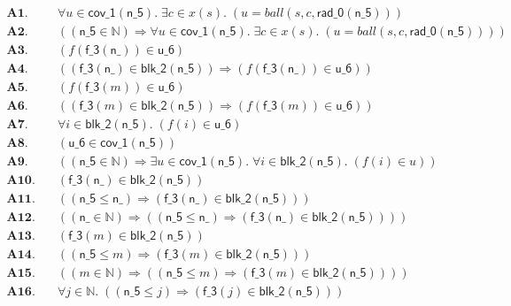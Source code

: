 \documentclass[11pt]{article}
\begin{document}
\begin{align*}
  \mathbf{A1.}\quad & \forall u \in \mathsf{cov\_1}(\mathsf{n\_5}).\; \exists c \in x(s).\; (u = \mathit{ball}(s, c, \mathsf{rad\_0}(\mathsf{n\_5}))) \\
  \mathbf{A2.}\quad & ((\mathsf{n\_5} \in \mathbb{N}) \Rightarrow \forall u \in \mathsf{cov\_1}(\mathsf{n\_5}).\; \exists c \in x(s).\; (u = \mathit{ball}(s, c, \mathsf{rad\_0}(\mathsf{n\_5})))) \\
  \mathbf{A3.}\quad & (f(\mathsf{f\_3}(\mathsf{n\_})) \in \mathsf{u\_6}) \\
  \mathbf{A4.}\quad & ((\mathsf{f\_3}(\mathsf{n\_}) \in \mathsf{blk\_2}(\mathsf{n\_5})) \Rightarrow (f(\mathsf{f\_3}(\mathsf{n\_})) \in \mathsf{u\_6})) \\
  \mathbf{A5.}\quad & (f(\mathsf{f\_3}(m)) \in \mathsf{u\_6}) \\
  \mathbf{A6.}\quad & ((\mathsf{f\_3}(m) \in \mathsf{blk\_2}(\mathsf{n\_5})) \Rightarrow (f(\mathsf{f\_3}(m)) \in \mathsf{u\_6})) \\
  \mathbf{A7.}\quad & \forall i \in \mathsf{blk\_2}(\mathsf{n\_5}).\; (f(i) \in \mathsf{u\_6}) \\
  \mathbf{A8.}\quad & (\mathsf{u\_6} \in \mathsf{cov\_1}(\mathsf{n\_5})) \\
  \mathbf{A9.}\quad & ((\mathsf{n\_5} \in \mathbb{N}) \Rightarrow \exists u \in \mathsf{cov\_1}(\mathsf{n\_5}).\; \forall i \in \mathsf{blk\_2}(\mathsf{n\_5}).\; (f(i) \in u)) \\
  \mathbf{A10.}\quad & (\mathsf{f\_3}(\mathsf{n\_}) \in \mathsf{blk\_2}(\mathsf{n\_5})) \\
  \mathbf{A11.}\quad & ((\mathsf{n\_5} \leq \mathsf{n\_}) \Rightarrow (\mathsf{f\_3}(\mathsf{n\_}) \in \mathsf{blk\_2}(\mathsf{n\_5}))) \\
  \mathbf{A12.}\quad & ((\mathsf{n\_} \in \mathbb{N}) \Rightarrow ((\mathsf{n\_5} \leq \mathsf{n\_}) \Rightarrow (\mathsf{f\_3}(\mathsf{n\_}) \in \mathsf{blk\_2}(\mathsf{n\_5})))) \\
  \mathbf{A13.}\quad & (\mathsf{f\_3}(m) \in \mathsf{blk\_2}(\mathsf{n\_5})) \\
  \mathbf{A14.}\quad & ((\mathsf{n\_5} \leq m) \Rightarrow (\mathsf{f\_3}(m) \in \mathsf{blk\_2}(\mathsf{n\_5}))) \\
  \mathbf{A15.}\quad & ((m \in \mathbb{N}) \Rightarrow ((\mathsf{n\_5} \leq m) \Rightarrow (\mathsf{f\_3}(m) \in \mathsf{blk\_2}(\mathsf{n\_5})))) \\
  \mathbf{A16.}\quad & \forall j \in \mathbb{N}.\; ((\mathsf{n\_5} \leq j) \Rightarrow (\mathsf{f\_3}(j) \in \mathsf{blk\_2}(\mathsf{n\_5}))) \\

\end{align*}
\end{document}
